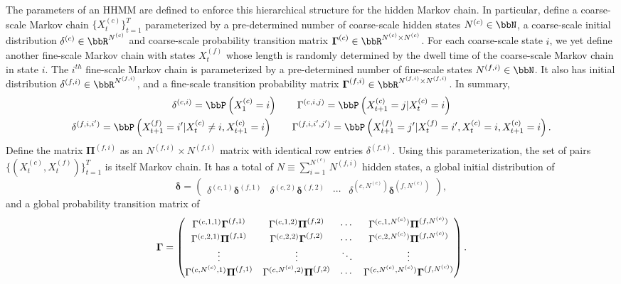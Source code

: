 The parameters of an HHMM are defined to enforce this hierarchical structure for the hidden Markov chain. In particular, define a coarse-scale Markov chain $\{X^{(c)}_t\}_{t=1}^T$ parameterized by a pre-determined number of coarse-scale hidden states $N^{(c)} \in \bbN$, a coarse-scale initial distribution $\delta^{(c)} \in \bbR^{N^{(c)}}$ and coarse-scale probability transition matrix $\boldsymbol{\Gamma}^{(c)} \in \bbR^{{N^{(c)}} \times {N^{(c)}}}$. For each coarse-scale state $i$, we yet define another fine-scale Markov chain with states $X^{(f)}_t$ whose length is randomly determined by the dwell time of the coarse-scale Markov chain in state $i$. The $i^{th}$ fine-scale Markov chain is parameterized by a pre-determined number of fine-scale states $N^{(f,i)} \in \bbN$. It also has initial distribution $\delta^{(f,i)} \in \bbR^{N^{(f,i)}}$, and a fine-scale transition probability matrix $\boldsymbol{\Gamma}^{(f,i)} \in \bbR^{N^{(f,i)} \times N^{(f,i)}}$. In summary, 
%
\begin{gather}
    \delta^{(c,i)} = \bbP\left( X_1^{(c)} = i \right) \qquad 
    \Gamma^{(c,i,j)} = \bbP\left( X_{t+1}^{(c)} = j | X_{t}^{(c)} = i \right) \\
    \delta^{(f,i,i')} = \bbP\left( X_{t+1}^{(f)} = i' | X_{t}^{(c)} \neq i, X_{t+1}^{(c)} = i \right) \qquad 
    \Gamma^{(f,i,i',j')} = \bbP\left( X_{t+1}^{(f)} = j' | X_{t}^{(f)} = i', X_{t}^{(c)} = i, X_{t+1}^{(c)} = i \right).
\end{gather}
%
Define the matrix $\boldsymbol{\Pi}^{(f,i)}$ as an $N^{(f,i)} \times N^{(f,i)}$ matrix with identical row entries $\delta^{(f,i)}$. Using this parameterization, the set of pairs $\{(X^{(c)}_t,X^{(f)}_t)\}_{t=1}^T$ is itself Markov chain. It has a total of $N \equiv \sum_{i=1}^{N^{(c)}} N^{(f,i)}$ hidden states, a global initial distribution of
%
\begin{equation} 
\boldsymbol{\delta} = 
\begin{pmatrix}
\delta^{(c,1)}\boldsymbol{\delta}^{(f,1)} & \delta^{(c,2)}\boldsymbol{\delta}^{(f,2)}    & \cdots & \delta^{(c,N^{(c)})}\boldsymbol{\delta}^{(f,N^{(c)})}
\end{pmatrix},
\label{eqn:global_delta}
\end{equation}
%
and a global probability transition matrix of %
%
\begin{equation} 
\boldsymbol{\Gamma} = 
\begin{pmatrix}
\Gamma^{(c,1,1)}\boldsymbol{\Gamma}^{(f,1)}     & \Gamma^{(c,1,2)} \boldsymbol{\Pi}^{(f,2)}     & \cdots & \Gamma^{(c,1,N^{(c)})}\boldsymbol{\Pi}^{(f,N^{(c)})}  \cr
\Gamma^{(c,2,1)}\boldsymbol{\Pi}^{(f,1)} & \Gamma^{(c,2,2)} \boldsymbol{\Gamma}^{(f,2)}  & \cdots & \Gamma^{(c,2,N^{(c)})}\boldsymbol{\Pi}^{(f,N^{(c)})} \cr
\vdots & \vdots & \ddots & \vdots \cr 
\Gamma^{(c,N^{(c)},1)}\boldsymbol{\Pi}^{(f,1)} & \Gamma^{(c,N^{(c)},2)}\boldsymbol{\Pi}^{(f,2)}      & \cdots & \Gamma^{(c,N^{(c)},N^{(c)})} \boldsymbol{\Gamma}^{(f,N^{(c)})} 
\end{pmatrix}.
\label{exptpm2}
\end{equation}
